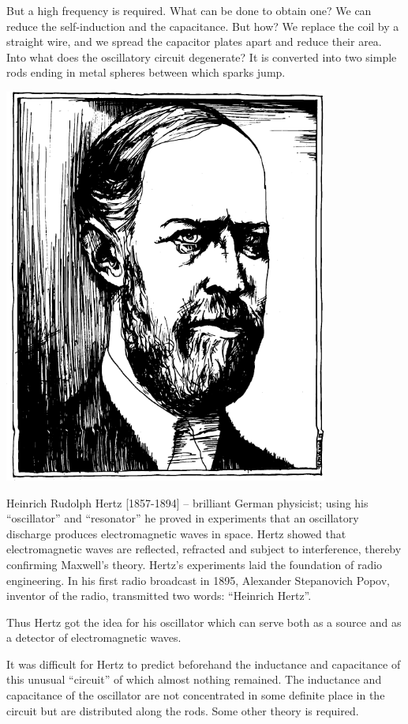 But a high frequency is required. What can be done to obtain one? We can reduce the self-induction and the capacitance. But how? We replace the coil by a straight wire, and we spread the capacitor plates apart and reduce their area. Into what does the oscillatory circuit degenerate? It is converted into two simple rods ending in metal spheres between which sparks jump.



\begin{center}
\includegraphics[width=0.8\textwidth]{figures/hertz.pdf}
\end{center}
{\small \textsf{{Heinrich Rudolph Hertz [1857-1894]}} -- \textsf{\footnotesize brilliant German physicist; using his ``oscillator'' and ``resonator'' he proved in experiments that an oscillatory discharge produces electromagnetic waves in space. Hertz showed that electromagnetic waves are reflected, refracted and subject to interference, thereby confirming Maxwell's theory. Hertz's experiments laid the foundation of radio engineering. In his first radio broadcast in 1895, Alexander Stepanovich Popov, inventor of the radio, transmitted two words: ``Heinrich Hertz''.}}

Thus Hertz got the idea for his oscillator which can serve both as a source and as a detector of electromagnetic waves.

It was difficult for Hertz to predict beforehand the inductance and capacitance of this unusual ``circuit'' of which almost nothing remained. The inductance and capacitance of the oscillator are not concentrated in some definite place in the circuit but are distributed along the rods. Some other theory is required.

